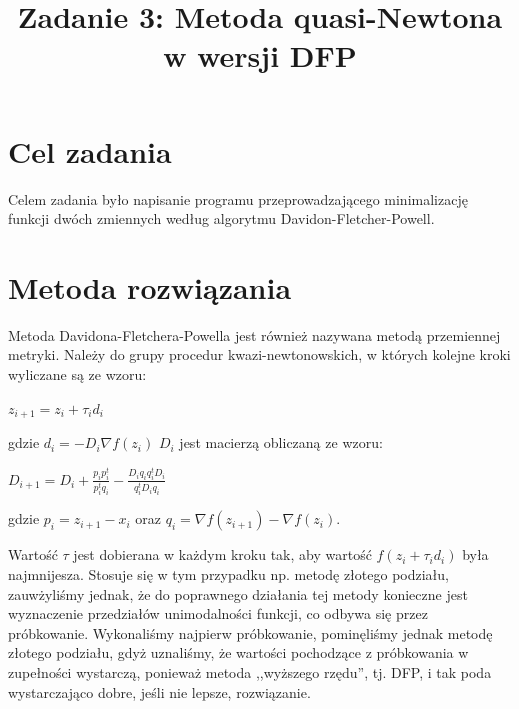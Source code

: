 \documentclass{classrep}
\author{%
  \studentinfo{Michał Janiszewski}{169485} \and
  \studentinfo{Leszek Wach}{169513}
}
\title{Zadanie 3: Metoda quasi-Newtona w wersji DFP}
\begin{document}
\maketitle

\section{Cel zadania}
Celem zadania było napisanie programu przeprowadzającego minimalizację funkcji dwóch zmiennych według algorytmu Davidon-Fletcher-Powell.

\section{Metoda rozwiązania}
Metoda Davidona-Fletchera-Powella jest również nazywana metodą przemiennej metryki. Należy do grupy procedur kwazi-newtonowskich, w których kolejne kroki wyliczane są ze wzoru:
\begin{center}
	$z_{i+1} = z_i + \tau_i d_i$
\end{center}
gdzie $d_i = -D_i \nabla f(z_i)$
$D_i$ jest macierzą obliczaną ze wzoru:
\begin{center}
\label{eq.dMatrix}
$D_{i+1} = D_i + \frac{p_i p^{t}_i}{p^{t}_i q_i} - \frac{D_i q_i q^{t}_i D_i}{q^{t}_i D_i q_i}$\\
\end{center}
gdzie $p_i = z_{i + 1} - x_i$ oraz $q_i = \nabla f(z_{i+1}) - \nabla f(z_i)$.

Wartość $\tau$ jest dobierana w każdym kroku tak, aby wartość $f(z_i + \tau_i d_i)$ była najmnijesza. Stosuje się w tym przypadku np. metodę złotego podziału, zauwżyliśmy jednak, że do poprawnego działania tej metody konieczne jest wyznaczenie przedziałów unimodalności funkcji, co odbywa się przez próbkowanie. Wykonaliśmy najpierw próbkowanie, pominęliśmy jednak metodę złotego podziału, gdyż uznaliśmy, że wartości pochodzące z próbkowania w zupełności wystarczą, ponieważ metoda ,,wyższego rzędu'', tj. DFP, i tak poda wystarczająco dobre, jeśli nie lepsze, rozwiązanie.
\end{document}
